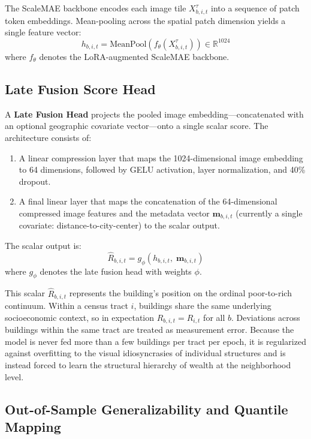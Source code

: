 \documentclass{article}
\begin{document}
The ScaleMAE backbone encodes each image tile $X_{b,i,t}^\tau$ into a sequence of patch token embeddings. Mean-pooling across the spatial patch dimension yields a single feature vector:
\begin{equation}
h_{b,i,t} = \text{MeanPool}\!\left( f_\theta\!\left(X_{b,i,t}^\tau\right) \right) \in \mathbb{R}^{1024}
\end{equation}
where $f_\theta$ denotes the LoRA-augmented ScaleMAE backbone.

\subsection{Late Fusion Score Head}

A \textbf{Late Fusion Head} projects the pooled image embedding---concatenated with an optional geographic covariate vector---onto a single scalar score. The architecture consists of:
\begin{enumerate}
    \item A linear compression layer that maps the 1024-dimensional image embedding to 64 dimensions, followed by GELU activation, layer normalization, and 40\% dropout.
    \item A final linear layer that maps the concatenation of the 64-dimensional compressed image features and the metadata vector $\mathbf{m}_{b,i,t}$ (currently a single covariate: distance-to-city-center) to the scalar output.
\end{enumerate}

The scalar output is:
\begin{equation}
\hat{R}_{b,i,t} = g_\phi\!\left(h_{b,i,t},\; \mathbf{m}_{b,i,t}\right)
\end{equation}
where $g_\phi$ denotes the late fusion head with weights $\phi$.

This scalar $\hat{R}_{b,i,t}$ represents the building's position on the ordinal poor-to-rich continuum. Within a census tract $i$, buildings share the same underlying socioeconomic context, so in expectation $\hat{R}_{b,i,t} = \hat{R}_{i,t}$ for all $b$. Deviations across buildings within the same tract are treated as measurement error. Because the model is never fed more than a few buildings per tract per epoch, it is regularized against overfitting to the visual idiosyncrasies of individual structures and is instead forced to learn the structural hierarchy of wealth at the neighborhood level.

\subsection{Out-of-Sample Generalizability and Quantile Mapping}
\end{document}

